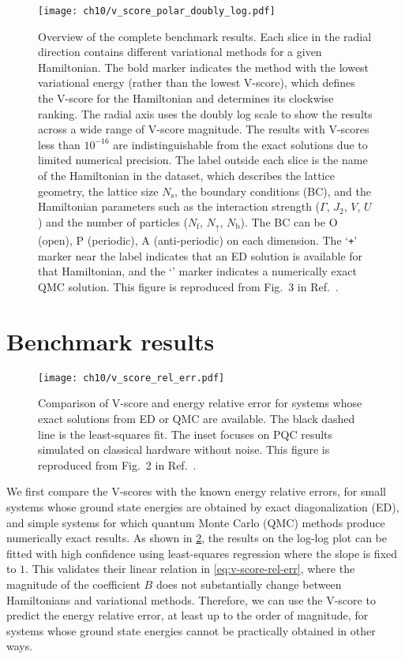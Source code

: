 \begin{figure}[!h]
\centering
\hspace*{-0.05\linewidth}
\texttt{[image: ch10/v\_score\_polar\_doubly\_log.pdf]}
\caption[Overview of VarBench results]{
Overview of the complete benchmark results.
Each slice in the radial direction contains different variational methods for a given Hamiltonian. The bold marker indicates the method with the lowest variational energy (rather than the lowest V-score), which defines the V-score for the Hamiltonian and determines its clockwise ranking.
The radial axis uses the doubly log scale to show the results across a wide range of V-score magnitude.
The results with V-scores less than $10^{-16}$ are indistinguishable from the exact solutions due to limited numerical precision.
The label outside each slice is the name of the Hamiltonian in the dataset, which describes the lattice geometry, the lattice size $N_\text{s}$, the boundary conditions (BC), and the Hamiltonian parameters such as the interaction strength ($\Gamma$, $J_2$, $V$, $U$) and the number of particles ($N_\mathrm{f}$, $N_{\uparrow}$, $N_\mathrm{b}$).
The BC can be O (open), P (periodic), A (anti-periodic) on each dimension.
The `\texttt{+}' marker near the label indicates that an ED solution is available for that Hamiltonian, and the `\texttt{\textasteriskcentered}' marker indicates a numerically exact QMC solution.
This figure is reproduced from Fig.~3 in Ref.~\cite{wu2023variational}.
}
\label{fig:v-score}
\end{figure}

\newpage

\section{Benchmark results}

\begin{figure}[htb]
\centering
\texttt{[image: ch10/v\_score\_rel\_err.pdf]}
\caption[Comparison of V-score and energy relative error]{
Comparison of V-score and energy relative error for systems whose exact solutions from ED or QMC are available.
The black dashed line is the least-squares fit.
The inset focuses on PQC results simulated on classical hardware without noise.
This figure is reproduced from Fig.~2 in Ref.~\cite{wu2023variational}.
}
\label{fig:v-score-rel-err}
\end{figure}

We first compare the V-scores with the known energy relative errors, for small systems whose ground state energies are obtained by exact diagonalization (ED), and simple systems for which quantum Monte Carlo (QMC) methods produce numerically exact results. As shown in \cref{fig:v-score-rel-err}, the results on the log-log plot can be fitted with high confidence using least-squares regression where the slope is fixed to $1$. This validates their linear relation in \cref{eq:v-score-rel-err}, where the magnitude of the coefficient $B$ does not substantially change between Hamiltonians and variational methods. Therefore, we can use the V-score to predict the energy relative error, at least up to the order of magnitude, for systems whose ground state energies cannot be practically obtained in other ways.

